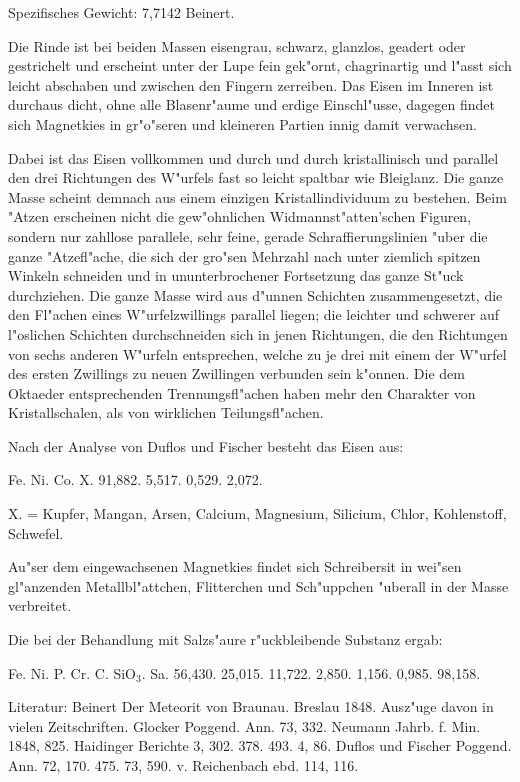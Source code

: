 \documentclass[a4paper, 11pt, oneside]{article}
\begin{document}
Spezifisches Gewicht: 7,7142 Beinert.

Die Rinde ist bei beiden Massen eisengrau, schwarz, glanzlos, geadert oder gestrichelt und erscheint unter der Lupe fein gek"ornt, chagrinartig und l"asst sich leicht abschaben und zwischen den Fingern zerreiben. Das Eisen im Inneren ist durchaus dicht, ohne alle Blasenr"aume und erdige Einschl"usse, dagegen findet sich Magnetkies in gr"o"seren und kleineren Partien innig damit verwachsen.

Dabei ist das Eisen vollkommen und durch und durch kristallinisch und parallel den drei Richtungen des W"urfels fast so leicht spaltbar wie Bleiglanz. Die ganze Masse scheint demnach aus einem einzigen Kristallindividuum zu bestehen. Beim "Atzen erscheinen nicht die gew"ohnlichen Widmannst"atten'schen Figuren, sondern nur zahllose parallele, sehr feine, gerade Schraffierungslinien "uber die ganze "Atzefl"ache, die sich der gro"sen Mehrzahl nach unter ziemlich spitzen Winkeln schneiden und in ununterbrochener Fortsetzung das ganze St"uck durchziehen. Die ganze Masse wird aus d"unnen Schichten zusammengesetzt, die den Fl"achen eines W"urfelzwillings parallel liegen; die leichter und schwerer auf l"oslichen Schichten durchschneiden sich in jenen Richtungen, die den Richtungen von sechs anderen W"urfeln entsprechen, welche zu je drei mit einem der W"urfel des ersten Zwillings zu neuen Zwillingen verbunden sein k"onnen. Die dem Oktaeder entsprechenden Trennungsfl"achen haben mehr den Charakter von Kristallschalen, als von wirklichen Teilungsfl"achen.

Nach der Analyse von Duflos und Fischer besteht das Eisen aus:

Fe. Ni. Co. X.  
91,882. 5,517. 0,529. 2,072.

X. = Kupfer, Mangan, Arsen, Calcium, Magnesium, Silicium, Chlor, Kohlenstoff, Schwefel.

Au"ser dem eingewachsenen Magnetkies findet sich Schreibersit in wei"sen gl"anzenden Metallbl"attchen, Flitterchen und Sch"uppchen "uberall in der Masse verbreitet.

Die bei der Behandlung mit Salzs"aure r"uckbleibende Substanz ergab:

Fe. Ni. P. Cr. C. SiO$_{3}$. Sa.  
56,430. 25,015. 11,722. 2,850. 1,156. 0,985. 98,158.

Literatur: Beinert Der Meteorit von Braunau. Breslau 1848. Ausz"uge davon in vielen Zeitschriften. Glocker Poggend. Ann. 73, 332. Neumann Jahrb. f. Min. 1848, 825. Haidinger Berichte 3, 302. 378. 493. 4, 86. Duflos und Fischer Poggend. Ann. 72, 170. 475. 73, 590. v. Reichenbach ebd. 114, 116.
\end{document}
